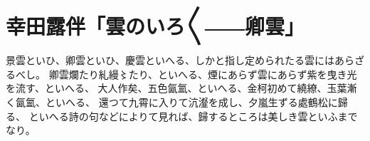 \documentclass[dvipdfmx]{utarticle}
\begin{document}
\section{幸田露伴「雲のいろ〳〵――卿雲」}
景雲といひ、卿雲といひ、慶雲といへる、しかと指し定められたる雲にはあらざるべし。
卿雲爛たり糺縵〻たり、といへる、煙にあらず雲にあらず紫を曳き光を流す、といへる、
大人作矣、五色氤氳、といへる、金柯初めて繞繚、玉葉漸く氤氳、といへる、
還つて九霄に入りて沆瀣を成し、夕嵐生ずる處鶴松に歸る、
といへる詩の句などによりて見れば、歸するところは美しき雲といふまでなり。
\end{document}

